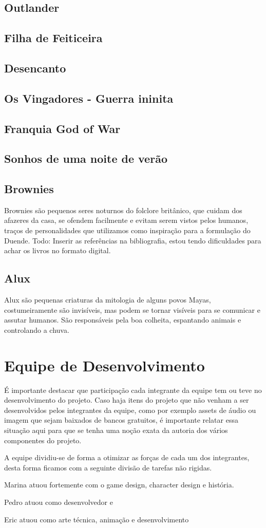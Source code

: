 \subsection{Outlander}
\subsection{Filha de Feiticeira}
\subsection{Desencanto}
\subsection{Os Vingadores - Guerra ininita}
\subsection{Franquia God of War}
\subsection{Sonhos de uma noite de verão}
\subsection{Brownies}
Brownies são pequenos seres noturnos do folclore britânico, que cuidam dos afazeres da casa, se ofendem facilmente e evitam serem vistos pelos humanos, traços de personalidades que utilizamos como inspiração para a formulação do Duende.
Todo: Inserir as referências na bibliografia, estou tendo dificuldades para achar os livros no formato digital.

\subsection{Alux}
Alux são pequenas criaturas da mitologia de alguns povos Mayas, costumeiramente são invisíveis, mas podem se tornar visíveis para se comunicar e assutar humanos.  São responsáveis pela boa colheita, espantando animais e controlando a chuva. 

\section{Equipe de Desenvolvimento}
É importante destacar que participação cada integrante da equipe tem ou teve no desenvolvimento do projeto.
Caso haja itens do projeto que não venham a ser desenvolvidos pelos integrantes da equipe, como por exemplo assets de áudio ou imagem que sejam baixados de bancos gratuitos, é importante relatar essa situação aqui para que se tenha uma noção exata da autoria dos vários componentes do projeto.

A equipe dividiu-se de forma a otimizar as forças de cada um dos integrantes, desta forma ficamos com a seguinte divisão de tarefas não rigidas. 

Marina atuou fortemente com o game design, character design e história. 

Pedro atuou como desenvolvedor e 

Eric atuou como arte técnica, animação e desenvolvimento